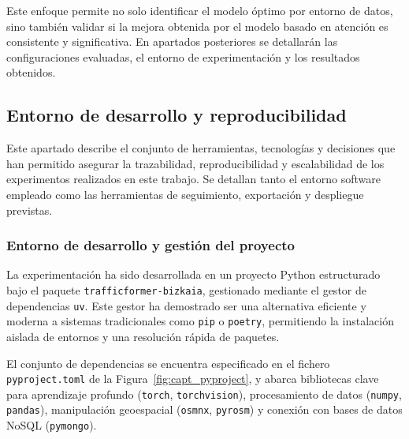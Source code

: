 Este enfoque permite no solo identificar el modelo óptimo por entorno de datos, sino también validar si la mejora obtenida por el modelo basado en atención es consistente y significativa. En apartados posteriores se detallarán las configuraciones evaluadas, el entorno de experimentación y los resultados obtenidos.

\subsection{Entorno de desarrollo y reproducibilidad}
\label{sec:entorno_reproducibilidad}

Este apartado describe el conjunto de herramientas, tecnologías y decisiones que han permitido asegurar la trazabilidad, reproducibilidad y escalabilidad de los experimentos realizados en este trabajo. Se detallan tanto el entorno software empleado como las herramientas de seguimiento, exportación y despliegue previstas.

\subsubsection*{Entorno de desarrollo y gestión del proyecto}

La experimentación ha sido desarrollada en un proyecto Python estructurado bajo el paquete \texttt{trafficformer-bizkaia}, gestionado mediante el gestor de dependencias \texttt{uv}. Este gestor ha demostrado ser una alternativa eficiente y moderna a sistemas tradicionales como \texttt{pip} o \texttt{poetry}, permitiendo la instalación aislada de entornos y una resolución rápida de paquetes.

El conjunto de dependencias se encuentra especificado en el fichero \texttt{pyproject.toml} de la Figura~\ref{fig:capt_pyproject}, y abarca bibliotecas clave para aprendizaje profundo (\texttt{torch}, \texttt{torchvision}), procesamiento de datos (\texttt{numpy}, \texttt{pandas}), manipulación geoespacial (\texttt{osmnx}, \texttt{pyrosm}) y conexión con bases de datos NoSQL (\texttt{pymongo}).

